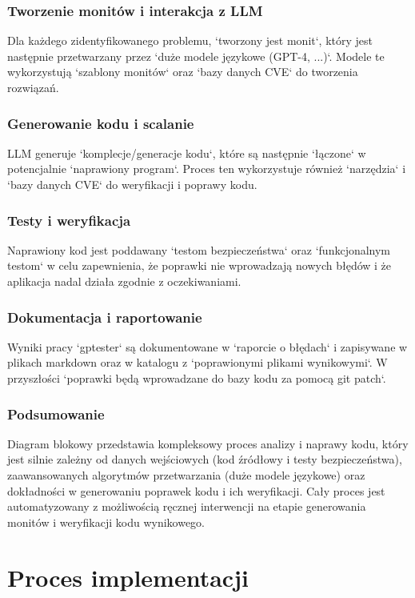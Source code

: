 \subsubsection{Tworzenie monitów i interakcja z LLM}
Dla każdego zidentyfikowanego problemu, `tworzony jest monit`, który jest następnie przetwarzany przez `duże modele językowe (GPT-4, ...)`. Modele te wykorzystują `szablony monitów` oraz `bazy danych CVE` do tworzenia rozwiązań.

\subsubsection{Generowanie kodu i scalanie}
LLM generuje `komplecje/generacje kodu`, które są następnie `łączone` w potencjalnie `naprawiony program`. Proces ten wykorzystuje również `narzędzia` i `bazy danych CVE` do weryfikacji i poprawy kodu.

\subsubsection{Testy i weryfikacja}
Naprawiony kod jest poddawany `testom bezpieczeństwa` oraz `funkcjonalnym testom` w celu zapewnienia, że poprawki nie wprowadzają nowych błędów i że aplikacja nadal działa zgodnie z oczekiwaniami.

\subsubsection{Dokumentacja i raportowanie}
Wyniki pracy `gptester` są dokumentowane w `raporcie o błędach` i zapisywane w plikach markdown oraz w katalogu z `poprawionymi plikami wynikowymi`. W przyszłości `poprawki będą wprowadzane do bazy kodu za pomocą git patch`.

\subsubsection{Podsumowanie}
Diagram blokowy przedstawia kompleksowy proces analizy i naprawy kodu, który jest silnie zależny od danych wejściowych (kod źródłowy i testy bezpieczeństwa), zaawansowanych algorytmów przetwarzania (duże modele językowe) oraz dokładności w generowaniu poprawek kodu i ich weryfikacji. Cały proces jest automatyzowany z możliwością ręcznej interwencji na etapie generowania monitów i weryfikacji kodu wynikowego.


\section{Proces implementacji}
